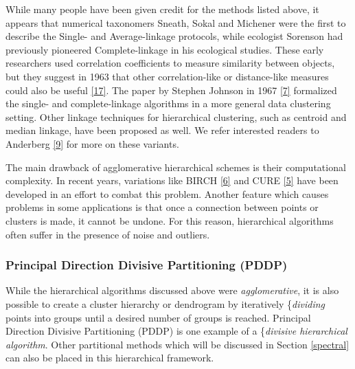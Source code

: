 \documentclass[
]{article}
\theoremstyle{definition}
\theoremstyle{definition}
\theoremstyle{definition}
\theoremstyle{definition}
\theoremstyle{remark}
\begin{document}
While many people have been given credit for the methods listed above, it appears that numerical taxonomers Sneath, Sokal and Michener were the first to describe the Single- and Average-linkage protocols, while ecologist Sorenson had previously pioneered Complete-linkage in his ecological studies. These early researchers used correlation coefficients to measure similarity between objects, but they suggest in 1963 that other correlation-like or distance-like measures could also be useful \protect\hyperlink{ref-sokal}{{[}17{]}}. The paper by Stephen Johnson in 1967 \protect\hyperlink{ref-johnson67}{{[}7{]}} formalized the single- and complete-linkage algorithms in a more general data clustering setting. Other linkage techniques for hierarchical clustering, such as centroid and median linkage, have been proposed as well. We refer interested readers to Anderberg \protect\hyperlink{ref-anderberg}{{[}9{]}} for more on these variants.

The main drawback of agglomerative hierarchical schemes is their computational complexity. In recent years, variations like BIRCH \protect\hyperlink{ref-birch}{{[}6{]}} and CURE \protect\hyperlink{ref-cure}{{[}5{]}} have been developed in an effort to combat this problem. Another feature which causes problems in some applications is that once a connection between points or clusters is made, it cannot be undone. For this reason, hierarchical algorithms often suffer in the presence of noise and outliers.

\hypertarget{principal-direction-divisive-partitioning-pddp}{%
\subsubsection{Principal Direction Divisive Partitioning (PDDP)}\label{principal-direction-divisive-partitioning-pddp}}

While the hierarchical algorithms discussed above were \emph{agglomerative}, it is also possible to create a cluster hierarchy or dendrogram by iteratively \{\emph{dividing} points into groups until a desired number of groups is reached. Principal Direction Divisive Partitioning (PDDP) is one example of a \{\emph{divisive hierarchical algorithm}. Other partitional methods which will be discussed in Section \ref{spectral} can also be placed in this hierarchical framework.
\end{document}
